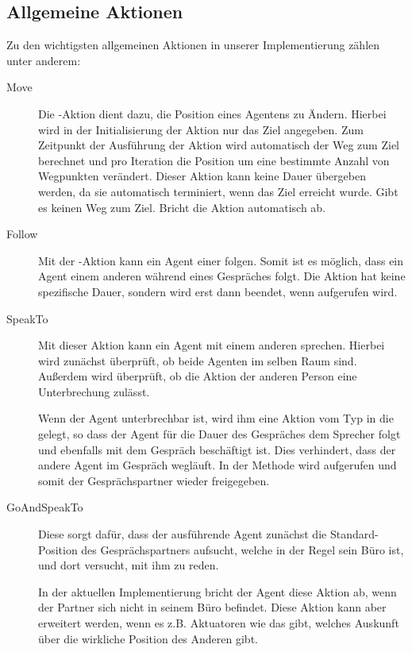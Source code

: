 \subsection{Allgemeine Aktionen}
Zu den wichtigsten allgemeinen Aktionen in unserer Implementierung zählen unter anderem:
\begin{description}
	\item[Move] Die -Aktion dient dazu, die Position eines Agentens zu Ändern. Hierbei wird in der Initialisierung der Aktion nur das Ziel angegeben. Zum Zeitpunkt der Ausführung der Aktion wird automatisch der Weg zum Ziel berechnet und pro Iteration die Position um eine bestimmte Anzahl von Wegpunkten verändert. Dieser Aktion kann keine Dauer übergeben werden, da sie automatisch terminiert, wenn das Ziel erreicht wurde. Gibt es keinen Weg zum Ziel. Bricht die Aktion automatisch ab.
	\item[Follow] Mit der -Aktion kann ein Agent einer    folgen. Somit ist es möglich, dass ein Agent einem anderen während eines Gespräches folgt. Die Aktion hat keine spezifische Dauer, sondern wird erst dann beendet, wenn  aufgerufen wird.
	\item[SpeakTo] Mit dieser Aktion kann ein Agent mit einem anderen sprechen. Hierbei wird zunächst überprüft, ob beide Agenten im selben Raum sind. Außerdem wird überprüft, ob die Aktion der anderen Person eine Unterbrechung zulässt.
	
	Wenn der Agent unterbrechbar ist, wird ihm eine Aktion vom Typ  in die  gelegt, so dass der Agent für die Dauer des Gespräches dem Sprecher folgt und ebenfalls mit dem Gespräch beschäftigt ist. Dies verhindert, dass der andere Agent im Gespräch wegläuft. In der Methode  wird  aufgerufen und somit der Gesprächspartner wieder freigegeben.
	\item[GoAndSpeakTo] Diese  sorgt dafür, dass der ausführende Agent zunächst die Standard-Position des Gesprächspartners aufsucht, welche in der Regel sein Büro ist, und dort versucht, mit ihm zu reden. 
	
	In der aktuellen Implementierung bricht der Agent diese Aktion ab, wenn der Partner sich nicht in seinem Büro befindet. Diese Aktion kann aber erweitert werden, wenn es z.B. Aktuatoren wie das  gibt, welches Auskunft über die wirkliche Position des Anderen gibt.
\end{description}
